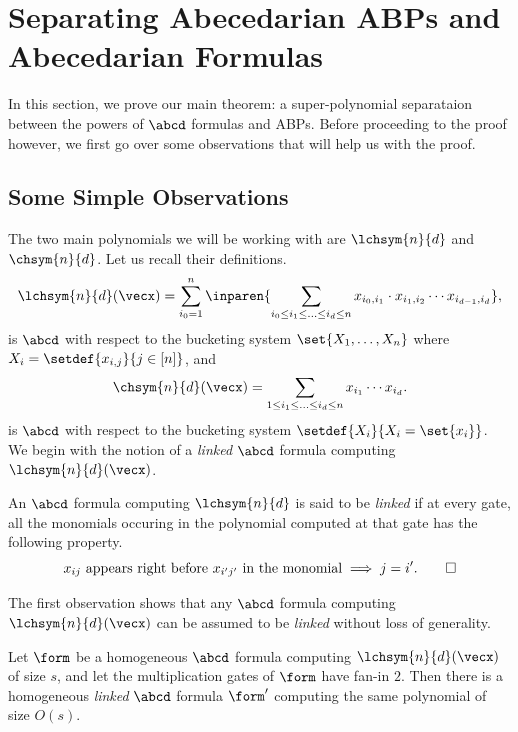 \section{Separating Abecedarian ABPs and Abecedarian Formulas}\label{sec:main}

In this section, we prove our main theorem: a super-polynomial separataion between the powers of $\abcd$ formulas and ABPs.
Before proceeding to the proof however, we first go over some observations that will help us with the proof.

\subsection{Some Simple Observations}

The two main polynomials we will be working with are $\lchsym{n}{d}$ and $\chsym{n}{d}$.
Let us recall their definitions.
\[
	\lchsym{n}{d}(\vecx) = \sum_{i_0=1}^{n} \inparen{\sum_{i_0 \leq i_1 \leq \ldots \leq i_d \leq n} x_{i_0, i_1} \cdot x_{i_1,i_2} \cdots x_{i_{d-1}, i_d}},
\]
is $\abcd$ with respect to the bucketing system $\set{X_1, \ldots, X_n}$ where $X_i = \setdef{x_{i,j}}{j \in [n]}$, and
\[
	\chsym{n}{d}(\vecx) = \sum_{1 \leq i_1 \leq \ldots \leq i_d \leq n} x_{i_1} \cdots x_{i_d}.	
\]
is $\abcd$ with respect to the bucketing system $\setdef{X_i}{X_i = \set{x_i}}$.\\

\noindent We begin with the notion of a \emph{linked} $\abcd$ formula computing $\lchsym{n}{d}(\vecx)$.

\begin{definition}
	An $\abcd$ formula computing $\lchsym{n}{d}$ is said to be \emph{linked} if at every gate, all the monomials occuring in the polynomial computed at that gate has the following property.
	\[
		x_{ij} \text{ appears right before } x_{i'j'} \text{ in the monomial} \implies j=i'. \qedhere	
	\]
\end{definition}

\noindent The first observation shows that any $\abcd$ formula computing $\lchsym{n}{d}(\vecx)$ can be assumed to be \emph{linked} without loss of generality.

\begin{observation}\label{obs:orderInterval}
	Let $\form$ be a homogeneous $\abcd$ formula computing $\lchsym{n}{d}(\vecx)$ of size $s$, and let the multiplication gates of $\form$ have fan-in $2$. 
	Then there is a homogeneous \emph{linked} $\abcd$ formula $\form'$ computing the same polynomial of size $O(s)$.
\end{observation}

